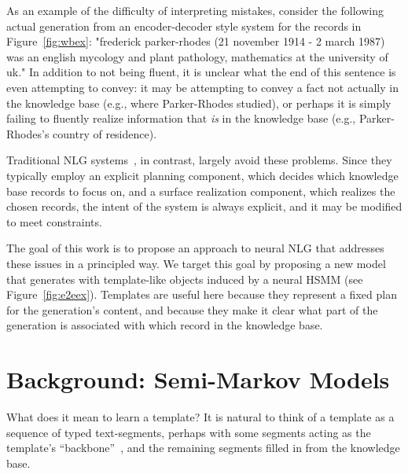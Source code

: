 \documentclass[11pt,a4paper]{article}
\begin{document}
As an example of the difficulty of interpreting mistakes, consider the following actual generation from an encoder-decoder style system for the records in Figure~\ref{fig:wbex}: "frederick parker-rhodes (21 november 1914 - 2 march 1987) was an english mycology and plant pathology, mathematics at the university of uk."
In addition to not being fluent, it is unclear what the end of this sentence is even attempting to convey: it  may be attempting to convey a fact not actually in the knowledge base (e.g., where Parker-Rhodes studied), or perhaps it is simply failing to fluently realize information that \textit{is} in the knowledge base (e.g., Parker-Rhodes's country of residence). 

Traditional NLG systems~\citep{kukich1983design,mckeown1992text,belz2008automatic,gatt2009simplenlg}, in contrast, largely avoid these problems. Since they typically employ an explicit planning component, which decides which knowledge base records to focus on, and a surface realization component, which realizes the chosen records, the intent of the system is always explicit, and it may be modified to meet constraints.


The goal of this work is to propose an approach to neural NLG that addresses these issues in a principled way. %
We target this goal by proposing a new model that generates with template-like objects induced by a neural HSMM (see Figure~\ref{fig:e2eex}). Templates are useful here because they represent a fixed plan for the generation's content, and because they make it clear what part of the generation is associated with which record in the knowledge base.

\section{Background: Semi-Markov Models}
What does it mean to learn a template? It is natural to think of a template as a sequence of typed text-segments, perhaps with some segments acting as the template's ``backbone''~\citep{wang2013domain}, and the remaining segments filled in from the knowledge base. 
\end{document}
